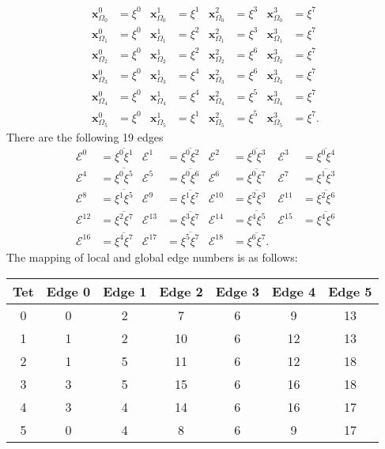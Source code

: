 \documentclass{scrartcl}
\begin{document}
\begin{align}
  \mathbf x^0_{\Omega_0}&=\xi^0 &
  \mathbf x^1_{\Omega_0}&=\xi^1 &
  \mathbf x^2_{\Omega_0}&=\xi^3 &
  \mathbf x^3_{\Omega_0}&=\xi^7 \\
  \mathbf x^0_{\Omega_1}&=\xi^0 &
  \mathbf x^1_{\Omega_1}&=\xi^2 &
  \mathbf x^2_{\Omega_1}&=\xi^3 &
  \mathbf x^3_{\Omega_1}&=\xi^7 \\
  \mathbf x^0_{\Omega_2}&=\xi^0 &
  \mathbf x^1_{\Omega_2}&=\xi^2 &
  \mathbf x^2_{\Omega_2}&=\xi^6 &
  \mathbf x^3_{\Omega_2}&=\xi^7 \\
  \mathbf x^0_{\Omega_3}&=\xi^0 &
  \mathbf x^1_{\Omega_3}&=\xi^4 &
  \mathbf x^2_{\Omega_3}&=\xi^6 &
  \mathbf x^3_{\Omega_3}&=\xi^7 \\
  \mathbf x^0_{\Omega_4}&=\xi^0 &
  \mathbf x^1_{\Omega_4}&=\xi^4 &
  \mathbf x^2_{\Omega_4}&=\xi^5 &
  \mathbf x^3_{\Omega_4}&=\xi^7 \\
  \mathbf x^0_{\Omega_5}&=\xi^0 &
  \mathbf x^1_{\Omega_5}&=\xi^1 &
  \mathbf x^2_{\Omega_5}&=\xi^5 &
  \mathbf x^3_{\Omega_5}&=\xi^7.
\end{align}
There are the following 19 edges
\begin{align}
  \mathcal E^0   &=\overline{\xi^0\xi^1} &
  \mathcal E^1   &=\overline{\xi^0\xi^2} &
  \mathcal E^2   &=\overline{\xi^0\xi^3} &
  \mathcal E^3   &=\overline{\xi^0\xi^4} \\
  \mathcal E^4   &=\overline{\xi^0\xi^5} &
  \mathcal E^5   &=\overline{\xi^0\xi^6} &
  \mathcal E^6   &=\overline{\xi^0\xi^7} &
  \mathcal E^7   &=\overline{\xi^1\xi^3} \\
  \mathcal E^8   &=\overline{\xi^1\xi^5} &
  \mathcal E^9   &=\overline{\xi^1\xi^7} &
  \mathcal E^{10}&=\overline{\xi^2\xi^3} &
  \mathcal E^{11}&=\overline{\xi^2\xi^6} \\
  \mathcal E^{12}&=\overline{\xi^2\xi^7} &
  \mathcal E^{13}&=\overline{\xi^3\xi^7} &
  \mathcal E^{14}&=\overline{\xi^4\xi^5} &
  \mathcal E^{15}&=\overline{\xi^4\xi^6} \\
  \mathcal E^{16}&=\overline{\xi^4\xi^7} &
  \mathcal E^{17}&=\overline{\xi^5\xi^7} &
  \mathcal E^{18}&=\overline{\xi^6\xi^7}.
\end{align}
The mapping of local and global edge numbers is as follows:
\begin{center}\begin{tabular}{c|c|c|c|c|c|c}
Tet & Edge 0 & Edge 1 & Edge 2 & Edge 3 & Edge 4 & Edge 5 \\
\hline
 0  &    0   &    2   &    7   &    6   &    9   &   13   \\
 1  &    1   &    2   &   10   &    6   &   12   &   13   \\
 2  &    1   &    5   &   11   &    6   &   12   &   18   \\
 3  &    3   &    5   &   15   &    6   &   16   &   18   \\
 4  &    3   &    4   &   14   &    6   &   16   &   17   \\
 5  &    0   &    4   &    8   &    6   &    9   &   17
\end{tabular}\end{center}
\end{document}
